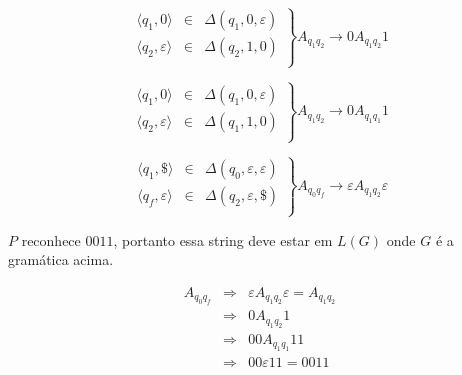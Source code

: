 \begin{example}
    \begin{center}
  \end{center}

\begin{displaymath}
  \left.\begin{array}{ccc}
    \langle q_1, 0 \rangle & \in & \Delta(q_1, 0, \varepsilon)\\
    \langle q_2, \varepsilon \rangle & \in & \Delta(q_2, 1, 0)\\
  \end{array}\right\} A_{q_1q_2} \to 0 A_{q_1q_2} 1
\end{displaymath}

\begin{displaymath}
  \left.\begin{array}{ccc}
    \langle q_1, 0 \rangle & \in & \Delta(q_1, 0, \varepsilon)\\
    \langle q_2, \varepsilon \rangle & \in & \Delta(q_1, 1, 0)\\
  \end{array}\right\} A_{q_1q_2} \to 0 A_{q_1q_1} 1
\end{displaymath}

\begin{displaymath}
  \left.\begin{array}{ccc}
      \langle q_1, \$ \rangle & \in & \Delta(q_0, \varepsilon, \varepsilon)\\
      \langle q_f, \varepsilon \rangle & \in & \Delta(q_2, \varepsilon, \$)\\
    \end{array}\right\} A_{q_0q_f} \to \varepsilon A_{q_1q_2} \varepsilon
\end{displaymath}

$P$ reconhece $0011$, portanto essa string deve estar em $L(G)$ onde $G$ é a gramática acima.


\begin{eqnarray*}
  A_{q_0q_f} & \Rightarrow & \varepsilon A_{q_1q_2} \varepsilon = A_{q_1q_2}\\
        & \Rightarrow & 0 A_{q_1q_2} 1 \\
        & \Rightarrow & 00 A_{q_1q_1} 11 \\
        & \Rightarrow & 00 \varepsilon 11 = 0011
\end{eqnarray*}
\end{example}



